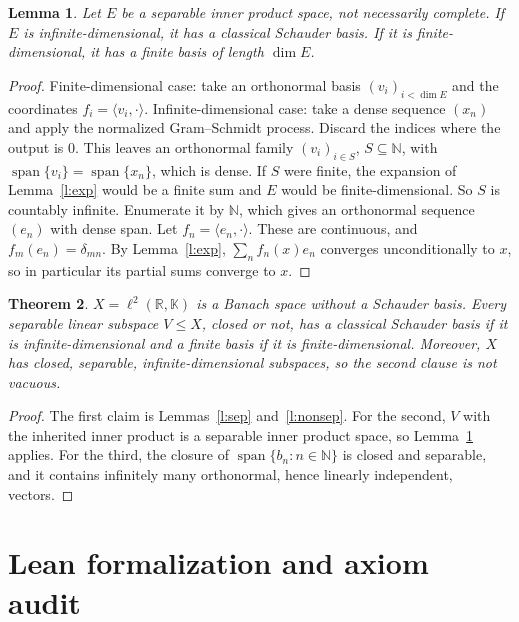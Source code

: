 \documentclass[11pt]{article}
\newtheorem{theorem}{Theorem}
\newtheorem{lemma}[theorem]{Lemma}
\theoremstyle{definition}
\newcommand{\K}{\mathbb{K}}
\newcommand{\ip}[2]{\langle #1,#2\rangle}
\begin{document}
\begin{lemma}\label{l:sepbasis}
Let $E$ be a separable inner product space, not necessarily complete. If $E$ is
infinite-dimensional, it has a classical Schauder basis. If it is finite-dimensional, it has a
finite basis of length $\dim E$.
\end{lemma}
\begin{proof}
Finite-dimensional case: take an orthonormal basis $(v_i)_{i<\dim E}$ and the coordinates
$f_i=\ip{v_i}{\cdot}$. Infinite-dimensional case: take a dense sequence $(x_n)$ and apply the
normalized Gram--Schmidt process. Discard the indices where the output is $0$. This leaves an
orthonormal family $(v_i)_{i\in S}$, $S\subseteq\mathbb{N}$, with
$\operatorname{span}\{v_i\}=\operatorname{span}\{x_n\}$, which is dense. If $S$ were finite, the
expansion of Lemma~\ref{l:exp} would be a finite sum and $E$ would be finite-dimensional. So $S$
is countably infinite. Enumerate it by $\mathbb{N}$, which gives an orthonormal sequence $(e_n)$
with dense span. Let $f_n=\ip{e_n}{\cdot}$. These are continuous, and $f_m(e_n)=\delta_{mn}$. By
Lemma~\ref{l:exp}, $\sum_n f_n(x)e_n$ converges unconditionally to $x$, so in particular its
partial sums converge to $x$.
\end{proof}

\begin{theorem}
$X=\ell^2(\mathbb{R},\K)$ is a Banach space without a Schauder basis. Every separable linear
subspace $V\le X$, closed or not, has a classical Schauder basis if it is infinite-dimensional and a
finite basis if it is finite-dimensional. Moreover, $X$ has closed, separable, infinite-dimensional
subspaces, so the second clause is not vacuous.
\end{theorem}
\begin{proof}
The first claim is Lemmas~\ref{l:sep} and~\ref{l:nonsep}. For the second, $V$ with the inherited
inner product is a separable inner product space, so Lemma~\ref{l:sepbasis} applies. For the
third, the closure of $\operatorname{span}\{b_n:n\in\mathbb{N}\}$ is closed and separable, and it
contains infinitely many orthonormal, hence linearly independent, vectors.
\end{proof}

\section{Lean formalization and axiom audit}
\end{document}
